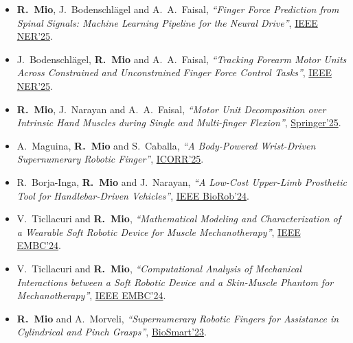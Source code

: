 \documentclass[a4paper,10pt]{article}
\begin{document}
\begin{itemize}
  \item \textbf{R.\ Mio}, J.\ Bodenschl\"agel and A.\ A.\ Faisal,
        \textit{``Finger Force Prediction from Spinal Signals: Machine Learning Pipeline for the
        Neural Drive''},
        \href{https://cmsfiles.s3.amazonaws.com/ner2025/proceedings/61569_CFP25CNE-ART/pdfs/0001194.pdf}{IEEE NER'25}.

  \item J.\ Bodenschl\"agel, \textbf{R.\ Mio} and A.\ A.\ Faisal,
        \textit{``Tracking Forearm Motor Units Across Constrained and Unconstrained Finger Force
        Control Tasks''},
        \href{https://cmsfiles.s3.amazonaws.com/ner2025/proceedings/61569_CFP25CNE-ART/pdfs/0000634.pdf}{IEEE NER'25}.

  \item \textbf{R.\ Mio}, J.\ Narayan and A.\ A.\ Faisal,
        \textit{``Motor Unit Decomposition over Intrinsic Hand Muscles during Single and
        Multi-finger Flexion''},
        \href{https://link.springer.com/chapter/10.1007/978-3-031-85000-4_25}{Springer'25}.

  \item A.\ Maguina, \textbf{R.\ Mio} and S.\ Caballa,
        \textit{``A Body-Powered Wrist-Driven Supernumerary Robotic Finger''},
        \href{https://ieeexplore.ieee.org/document/11063063}{ICORR'25}.

  \item R.\ Borja-Inga, \textbf{R.\ Mio} and J.\ Narayan,
        \textit{``A Low-Cost Upper-Limb Prosthetic Tool for Handlebar-Driven Vehicles''},
        \href{https://ieeexplore.ieee.org/document/10719816}{IEEE BioRob'24}.

  \item V.\ Ticllacuri and \textbf{R.\ Mio},
        \textit{``Mathematical Modeling and Characterization of a Wearable Soft Robotic Device
        for Muscle Mechanotherapy''},
        \href{https://ieeexplore.ieee.org/document/10782663}{IEEE EMBC'24}.

  \item V.\ Ticllacuri and \textbf{R.\ Mio},
        \textit{``Computational Analysis of Mechanical Interactions between a Soft Robotic Device
        and a Skin-Muscle Phantom for Mechanotherapy''},
        \href{https://ieeexplore.ieee.org/document/10782886}{IEEE EMBC'24}.

  \item \textbf{R.\ Mio} and A.\ Morveli,
        \textit{``Supernumerary Robotic Fingers for Assistance in Cylindrical and Pinch Grasps''},
        \href{https://ieeexplore.ieee.org/abstract/document/10162114}{BioSmart'23}.


\end{itemize}
\end{document}
